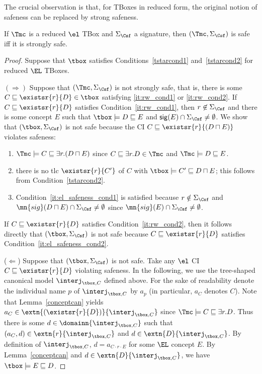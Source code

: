 \documentclass{lmcs}
\theoremstyle{definition}
\begin{document}
\smallskip
\noindent
The crucial observation is that, for \EL TBoxes in reduced form, the
original notion of safeness can be replaced by strong safeness.
%
\begin{lem}\label{lem:safe_eq_tbox_star_local}
  If $\Tmc$ is a reduced $\el$ TBox and $\Sigma_{\Csf}$ a signature, then $(\Tmc,\Sigma_\Csf)$ is safe iff it is strongly safe.
\end{lem}
\begin{proof}
  Suppose that $\tbox$ satisfies Conditions~\ref{tstarcond1}
  and~\ref{tstarcond2} for reduced $\EL$ TBoxes.

  \noindent $(\Rightarrow)$ Suppose that $(\Tmc,\Sigma_\Csf)$ is not
  strongly safe, that is, there is some
  $C\sqsubseteq\existsr{r}{D}\in\tbox$ satisfying \ref{it:rw_cond1} or
  \ref{it:rw_cond2}.  If $C\sqsubseteq\existsr{r}{D}$ satisfies
  Condition~\ref{it:rw_cond1}, then $r\not\in\Sigma_\Csf$ and there is some
  concept $E$ such that $\tbox\models D\sqsubseteq E$ and ${\sf
  sig}(E) \cap \Sigma_\Csf\not=\emptyset$. We show that $(\tbox,\Sigma_{\Csf})$ is not safe because the CI $C\sqsubseteq\existsr{r}{(D\sqcap E)}$ 
  violates safeness:
  \begin{enumerate}

  \item $\Tmc \models C \sqsubseteq \exists r . (D \sqcap E)$ since 
    $C \sqsubseteq \exists r . D \in \Tmc$ and $\Tmc \models D \sqsubseteq E$.

  \item there is no tlc $\existsr{r}{C'}$ of $C$ with $\tbox\models
    C'\sqsubseteq D \sqcap E$; this follows from Condition~\ref{tstarcond2}.

  \item Condition~\ref{it:el_safeness_cond1} is satisfied because $r \notin \Sigma_\Csf$ and 
    $\mn{sig}(D \sqcap E) \cap \Sigma_\Csf \neq \emptyset$ since $\mn{sig}(E) \cap \Sigma_\Csf \neq \emptyset$.

  \end{enumerate}
  If $C\sqsubseteq\existsr{r}{D}$ satisfies
  Condition~\ref{it:rw_cond2}, then it follows directly that $(\tbox,\Sigma_{\Csf})$ is not safe because $C\sqsubseteq\existsr{r}{D}$ satisfies
  Condition~\ref{it:el_safeness_cond2}.

  \proofdirectionskip ($\Leftarrow$) Suppose that $(\tbox,\Sigma_{\Csf})$ is not safe. Take any $\el$ CI 
  $C\sqsubseteq\existsr{r}{D}$ violating safeness. In the following, we
  use the tree-shaped canonical model $\interj_{\tbox,C}$ defined above. For the sake of
  readability denote the individual name $p$ of $\interj_{\tbox,C}$ by $a_{p}$ (in particular, $a_{C}$
  denotes $C$). Note that Lemma~\ref{conceptcan} yields
  $a_{C}\in\extn{(\existsr{r}{D})}{\interj_{\tbox,C}}$ since $\Tmc\models C \sqsubseteq \exists r.D$. 
  Thus there is some $d\in\domainn{\interj_{\tbox,C}}$ such that
  $(a_{C},d)\in\extn{r}{\interj_{\tbox,C}}$ and
  $d\in\extn{D}{\interj_{\tbox,C}}$. By definition of
  $\interj_{\tbox,C}$, $d=a_{C\cdot r\cdot E}$ for some $\EL$ concept
  $E$. By Lemma~\ref{conceptcan} and
  $d\in\extn{D}{\interj_{\tbox,C}}$, we have $\tbox\models E\sqsubseteq D$.


\end{proof}
\end{document}

